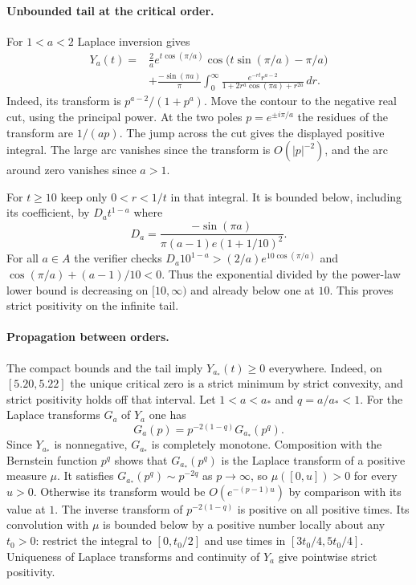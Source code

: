 \documentclass[11pt,a4paper]{article}
\numberwithin{equation}{section}
\begin{document}
\paragraph{Unbounded tail at the critical order.}
For $1<a<2$ Laplace inversion gives
\begin{align*}
 Y_a(t)={}&\frac2a e^{t\cos(\pi/a)}
          \cos\bigl(t\sin(\pi/a)-\pi/a\bigr)\\
  &+\frac{-\sin(\pi a)}\pi\int_0^\infty
     \frac{e^{-rt}r^{a-2}}{1+2r^a\cos(\pi a)+r^{2a}}\,dr.
\end{align*}
Indeed, its transform is $p^{a-2}/(1+p^a)$. Move the contour to the
negative real cut, using the principal power. At the two poles
$p=e^{\pm i\pi/a}$ the residues of the transform are $1/(ap)$.
The jump across the cut gives the displayed positive integral. The
large arc vanishes since the transform is $O(|p|^{-2})$, and the arc
around zero vanishes since $a>1$.

For $t\ge10$ keep only $0<r<1/t$ in that integral. It is bounded
below, including its coefficient, by $D_a t^{1-a}$ where
\[
 D_a=\frac{-\sin(\pi a)}{\pi(a-1)e(1+1/10)^2}.
\]
For all $a\in A$ the verifier checks $D_a10^{1-a}>(2/a)e^{10\cos(\pi/a)}$
and $\cos(\pi/a)+(a-1)/10<0$. Thus the exponential divided by the
power-law lower bound is decreasing on $[10,\infty)$ and already
below one at $10$. This proves strict positivity on the infinite tail.

\paragraph{Propagation between orders.}
The compact bounds and the tail imply $Y_{a_*}(t)\ge0$ everywhere.
Indeed, on $[5.20,5.22]$ the unique critical zero is a strict minimum
by strict convexity, and strict positivity holds off that interval.
Let $1<a<a_*$ and $q=a/a_*<1$. For the Laplace transforms $G_a$ of
$Y_a$ one has
\[
 G_a(p)=p^{-2(1-q)} G_{a_*}(p^q).
\]
Since $Y_{a_*}$ is nonnegative, $G_{a_*}$ is completely monotone.
Composition with the Bernstein function $p^q$ shows that $G_{a_*}(p^q)$
is the Laplace transform of a positive measure $\mu$. It satisfies
$G_{a_*}(p^q)\sim p^{-2q}$ as $p\to\infty$, so $\mu([0,u])>0$
for every $u>0$. Otherwise its transform would be $O(e^{-(p-1)u})$
by comparison with its value at $1$. The inverse transform of
$p^{-2(1-q)}$ is positive on all positive times. Its convolution
with $\mu$ is bounded below by a positive number locally about any
$t_0>0$: restrict the integral to $[0,t_0/2]$ and use times in
$[3t_0/4,5t_0/4]$. Uniqueness of Laplace transforms and continuity
of $Y_a$ give pointwise strict positivity.
\end{document}
